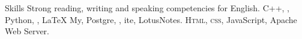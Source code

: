 
\begin{rubric}{Skills}
\entry*[Languages]
	Strong reading, writing and speaking competencies for English.
	C++, , Python, , \LaTeX
\entry*[Databases]
	My, Postgre, , ite, LotusNotes.
	\textsc{Html, css}, JavaScript, Apache Web Server.
\end{rubric}
